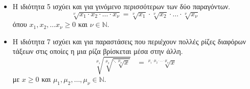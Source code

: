 \vspace{-7mm}
\begin{itemize}[itemsep=0mm]
\item Η ιδιότητα 5 ισχύει και για γινόμενο περισσότερων των δύο παραγόντων. \[ \sqrt[\nu]{x_1\cdot x_2\cdot\ldots\cdot x_\nu}=\!\sqrt[\nu]{x_1}\cdot\!\sqrt[\nu]{x_2}\cdot\ldots\cdot\!\sqrt[\nu]{x_\nu} \] όπου $ x_1,x_2,\ldots x_\nu\geq0 $ και $ \nu\in\mathbb{N} $.
\item Η ιδιότητα 7 ισχύει και για παραστάσεις που περιέχουν πολλές ρίζες διαφόρων τάξεων στις οποίες η μια ρίζα βρίσκεται μέσα στην άλλη. \[ \sqrt[\mu_1]{\!\sqrt[\mu_2]{\mbox{}^{\ddots}\sqrt[\mu_{\nu}]{x}}}\;\;\;=\sqrt[\mu_1\cdot\mu_2\cdot\ldots\cdot\mu_\nu]{x} \] με $ x\geq0 $ και $ \mu_1,\mu_2,\ldots,\mu_\nu\in\mathbb{N} $.
\end{itemize}
\Lymena
\begin{Methodos}[Παραγοντοποίηση]{4cm}

\end{Methodos}
